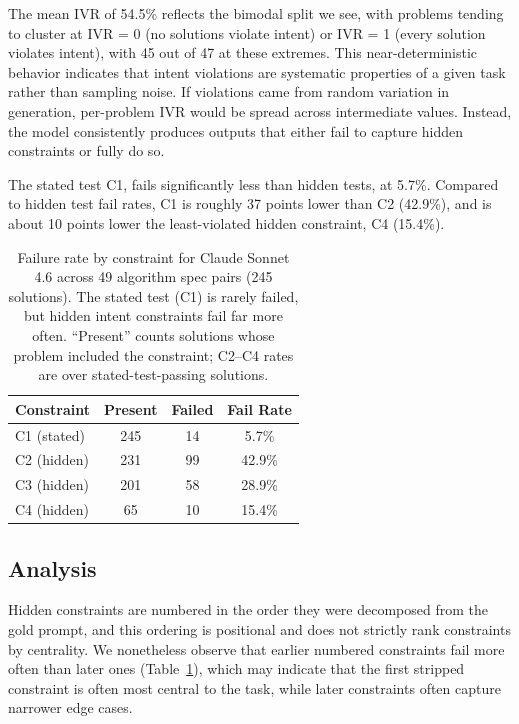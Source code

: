 \documentclass[11pt]{article}
\begin{document}
The mean IVR of 54.5\% reflects the bimodal split we see, with problems tending to cluster at IVR = 0 (no solutions violate intent) or IVR = 1 (every solution violates intent), with 45 out of 47 at these extremes. This near-deterministic behavior indicates that intent violations are systematic properties of a given task rather than sampling noise. If violations came from random variation in generation, per-problem IVR would be spread across intermediate values. Instead, the model consistently produces outputs that either fail to capture hidden constraints or fully do so.

The stated test C1, fails significantly less than hidden tests, at 5.7\%. Compared to hidden test fail rates, C1 is roughly 37 points lower than C2 (42.9\%), and is about 10 points lower the least-violated hidden constraint, C4 (15.4\%). 

\begin{table}[ht]
\centering
\begin{tabular}{@{}lccc@{}}
\toprule
\textbf{Constraint} & \textbf{Present} & \textbf{Failed} & \textbf{Fail Rate} \\
\midrule
C1 (stated)   & 245 & 14 & 5.7\% \\
C2 (hidden)   & 231 & 99 & 42.9\% \\
C3 (hidden)   & 201 & 58 & 28.9\% \\
C4 (hidden)   & 65  & 10 & 15.4\% \\
\bottomrule
\end{tabular}
\caption{Failure rate by constraint for Claude Sonnet 4.6
across 49 algorithm spec pairs (245 solutions). The stated
test (C1) is rarely failed, but hidden intent constraints
fail far more often. ``Present'' counts solutions whose problem
included the constraint; C2--C4 rates are over
stated-test-passing solutions.}
\label{tab:main-results}
\end{table}

\subsection{Analysis}
Hidden constraints are numbered in the order they were decomposed from the gold prompt, and this ordering is positional and does not strictly rank constraints by centrality. We nonetheless observe that earlier numbered constraints fail more often than later ones (Table~\ref{tab:main-results}), which may indicate that the first stripped constraint is often most central to the task, while later constraints often capture narrower edge cases. 
\end{document}
